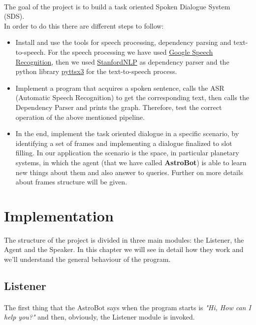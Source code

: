 \documentclass[12pt, a4paper]{article}
\begin{document}
\paragraph{}
The goal of the project is to build a task oriented Spoken Dialogue System (SDS).
\\In order to do this there are different steps to follow:
\begin{itemize}
\item Install and use the tools for speech processing, dependency parsing and text-to-speech.
For the speech processing we have used \href{https://pypi.org/project/SpeechRecognition/}{Google Speech Recognition}, then we used \href{https://stanfordnlp.github.io/stanfordnlp/}{StanfordNLP} as dependency parser and the python library \href{https://pypi.org/project/pyttsx3/}{pyttsx3} for the text-to-speech process.
\item Implement a program that acquires a spoken sentence, calls the ASR (Automatic Speech Recognition) to get the corresponding text, then calls the Dependency Parser and prints the graph. Therefore, test the correct operation of the above mentioned pipeline.
\item In the end, implement the task oriented dialogue in a specific scenario, by identifying a set of frames and implementing a dialogue finalized to slot filling. In our application the scenario is the space, in particular planetary systems, in which the agent (that we have called \textbf{AstroBot}) is able to learn new things about them and also answer to queries. Further on more details about frames structure will be given.
\end{itemize}
\section{Implementation}\label{2}
\paragraph{}
The structure of the project is divided in three main modules: the Listener, the Agent and the Speaker.
In this chapter we will see in detail how they work and we'll understand the general behaviour of the program.
\subsection{Listener}
\paragraph{}
The first thing that the AstroBot says when the program starts is \textit{"Hi, How can I help you?"} and then, obviously, the Listener module is invoked.
\end{document}
